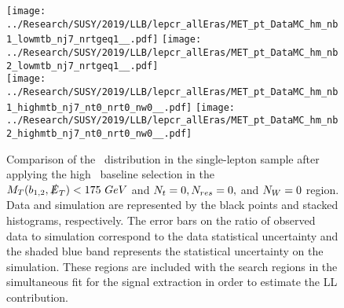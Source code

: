 \begin{figure}[!htb]
	\begin{center}
  \texttt{[image: ../Research/SUSY/2019/LLB/lepcr\_allEras/MET\_pt\_DataMC\_hm\_nb1\_lowmtb\_nj7\_nrtgeq1\_\_.pdf]}
  \texttt{[image: ../Research/SUSY/2019/LLB/lepcr\_allEras/MET\_pt\_DataMC\_hm\_nb2\_lowmtb\_nj7\_nrtgeq1\_\_.pdf]} \\
  \texttt{[image: ../Research/SUSY/2019/LLB/lepcr\_allEras/MET\_pt\_DataMC\_hm\_nb1\_highmtb\_nj7\_nt0\_nrt0\_nw0\_\_.pdf]}
  \texttt{[image: ../Research/SUSY/2019/LLB/lepcr\_allEras/MET\_pt\_DataMC\_hm\_nb2\_highmtb\_nj7\_nt0\_nrt0\_nw0\_\_.pdf]} \\
	\end{center}
	\caption{Comparison of the \met~distribution in the single-lepton sample after applying the high \dm~baseline selection in the $M_{T}(b_{1,2},\slashed{E}_{T})<175~GeV$ and $N_{t}=0, N_{res}=0,$ and $N_{W}=0$ region. Data and simulation are represented by the black points and stacked histograms, respectively. The error bars on the ratio of observed data to simulation correspond to the data statistical uncertainty and the shaded blue band represents the statistical uncertainty on the simulation. These regions are included with the search regions in the simultaneous fit for the signal extraction in order to estimate the LL contribution.
	 }
	\label{fig:llb-1lcr-datavsmc-hm-nt0-nrt0-nw0}
\end{figure}

